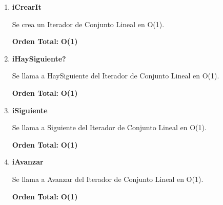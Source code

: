 \vspace*{1em}
\begin{enumerate}

\item\textbf{iCrearIt}
\par Se crea un Iterador de Conjunto Lineal en O(1).
\par \textbf{Orden Total:} \textbf{O(1)}

\item\textbf{iHaySiguiente?}
\par Se llama a HaySiguiente del Iterador de Conjunto Lineal en O(1).
\par \textbf{Orden Total:} \textbf{O(1)}

\item\textbf{iSiguiente}
\par Se llama a Siguiente del Iterador de Conjunto Lineal en O(1).
\par \textbf{Orden Total:} \textbf{O(1)}

\item\textbf{iAvanzar}
\par Se llama a Avanzar del Iterador de Conjunto Lineal en O(1).
\par \textbf{Orden Total:} \textbf{O(1)}

\end{enumerate}



